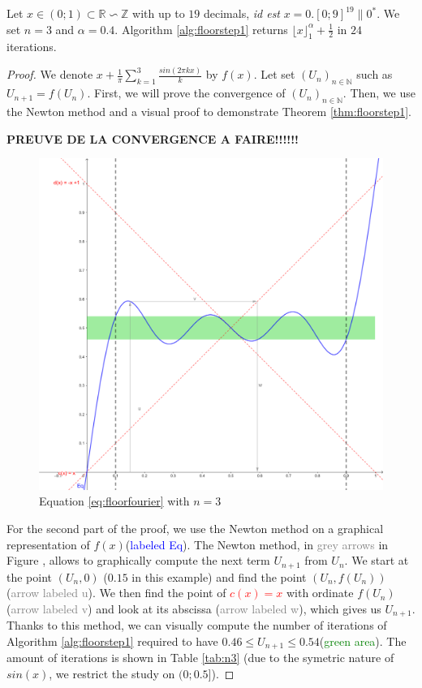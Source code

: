 \documentclass[runningheads]{llncs}
\begin{document}
\begin{theorem}\label{thm:floorstep1}
  Let $x\in(0;1)\subset\mathbb{R}\backsim \mathbb{Z}$ with up to $19$ decimals, \emph{id est} $x= 0.[0;9]^{19}\|{0}^*$. We set $n=3$ and $\alpha=0.4$. Algorithm \ref{alg:floorstep1} returns $\lfloor x \rfloor_1^\alpha+\frac{1}{2}$ in $24$ iterations.
\end{theorem}
\begin{proof}
  We denote $x + \frac{1}{\pi}\sum_{k=1}^{3}\frac{sin(2\pi k x)}{k}$ by $f(x)$. Let set $(U_n)_{n\in\mathbb{N}}$ such as $U_{n+1} = f(U_n)$. First, we will prove the convergence of $(U_n)_{n\in\mathbb{N}}$. Then, we use the Newton method and a visual proof to demonstrate Theorem \ref{thm:floorstep1}.

  \medskip

  \noindent \textbf{PREUVE DE LA CONVERGENCE A FAIRE!!!!!!}

  \begin{figure}[h!]
    \includegraphics[width =\textwidth]{figure/eqn7Newton.png}
    \caption{Equation \ref{eq:floorfourier} with $n=3$}
    \label{fig:newton3}
  \end{figure}

  For the second part of the proof, we use the Newton method on a graphical representation of $f(x)$(\textcolor{blue}{labeled Eq}). The Newton method, in \textcolor{gray}{grey arrows} in Figure , allows to graphically compute the next term $U_{n+1}$ from $U_n$. We start at the point $(U_n,0)$ ($\num{0.15}$ in this example) and find the point $(U_n,f(U_n))$ (\textcolor{gray}{arrow labeled u}). We then find the point of \textcolor{red}{$c(x)=x$} with ordinate $f(U_n)$ (\textcolor{gray}{arrow labeled v}) and look at its abscissa (\textcolor{gray}{arrow labeled w}), which gives us $U_{n+1}$. Thanks to this method, we can visually compute the number of iterations of Algorithm \ref{alg:floorstep1} required to have $\num{0.46}\leq U_{n+1}\leq \num{0.54}$(\textcolor{green}{green area}). The amount of iterations is shown in Table \ref{tab:n3} (due to the symetric nature of $sin(x)$, we restrict the study on $(0;\num{0.5}]$).


\end{proof}
\end{document}

